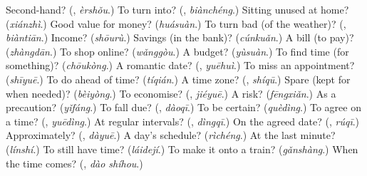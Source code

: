 \begin{tcolorbox}[breakable,colback=teal!4,colframe=teal!35!black,title={Before you move on}]
Second-hand? (\textbf{}, \emph{èrshǒu}.) To turn into? (\textbf{}, \emph{biànchéng}.) Sitting unused at home? (\emph{xiánzhì}.) Good value for money? (\emph{huásuàn}.) To turn bad (of the weather)? (\textbf{}, \emph{biàntiān}.) Income? (\emph{shōurù}.) Savings (in the bank)? (\emph{cúnkuǎn}.) A bill (to pay)? (\emph{zhàngdān}.) To shop online? (\emph{wǎnggòu}.) A budget? (\emph{yùsuàn}.) To find time (for something)? (\emph{chōukòng}.) A romantic date? (\textbf{}, \emph{yuēhuì}.) To miss an appointment? (\emph{shīyuē}.) To do ahead of time? (\emph{tíqián}.) A time zone? (\textbf{}, \emph{shíqū}.) Spare (kept for when needed)? (\emph{bèiyòng}.) To economise? (\textbf{}, \emph{jiéyuē}.) A risk? (\emph{fēngxiǎn}.) As a precaution? (\emph{yǐfáng}.) To fall due? (\textbf{}, \emph{dàoqī}.) To be certain? (\emph{quèdìng}.) To agree on a time? (\textbf{}, \emph{yuēdìng}.) At regular intervals? (\textbf{}, \emph{dìngqī}.) On the agreed date? (\textbf{}, \emph{rúqī}.) Approximately? (\textbf{}, \emph{dàyuē}.) A day's schedule? (\emph{rìchéng}.) At the last minute? (\emph{línshí}.) To still have time? (\emph{láidejí}.) To make it onto a train? (\emph{gǎnshàng}.) When the time comes? (\textbf{}, \emph{dào shíhou}.)
\end{tcolorbox}
